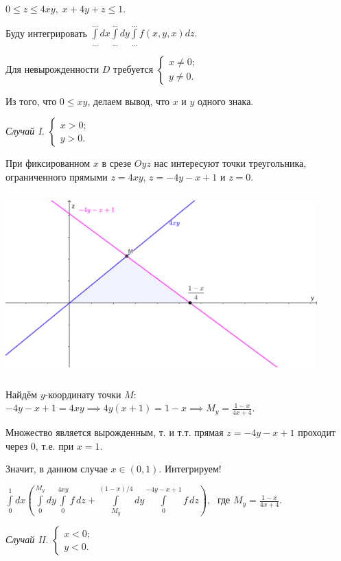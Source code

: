 \documentclass[a4paper, fleqn]{article}
\begin{document}
    $0 \leq z \leq 4xy, \; x + 4y + z \leq 1. $
    
    Буду интегрировать $\displaystyle \int \limits_{\dots}^{\dots} dx \int \limits_{\dots}^{\dots} dy \int \limits_{\dots}^{\dots} f(x, y, x) dz.$
    
    Для невырожденности $D$ требуется $\begin{cases} x \neq 0; \\ y \neq 0. \end{cases}$
    
    Из того, что $0 \leq xy$, делаем вывод, что $x$  и $y$ одного знака.
    
    \textit{Случай I.} $\begin{cases} x > 0; \\ y > 0. \end{cases}$
    
    При фиксированном $x$ в срезе $Oyz$ нас интересуют точки треугольника, ограниченного прямыми $z = 4xy$, $z = -4y - x + 1$ и $z = 0$.
    
   \includegraphics[width=12cm, height=7cm]{list24imgs/task 2.4.5.png}
   
   Найдём $y$-координату точки $M$: $ -4y -x + 1 = 4xy \implies 4y(x + 1) = 1 - x \implies M_y = \frac{1 - x}{4x  + 4}.$
   
   Множество является вырожденным, т. и т.т. прямая $z = -4y - x + 1$ проходит через $0$, т.е. при $x = 1.$
   
   Значит, в данном случае $x \in (0, 1)$. Интегрируем!
   
   $\displaystyle \int \limits_{0}^{1} dx \left( \int \limits_{0}^{M_y} dy \int \limits_{0}^{4xy} f \,  dz + \int \limits_{M_y}^{(1 - x)/4} dy \int \limits_{0}^{-4y - x + 1} f \,  dz \right), \; $ где  $M_y = \frac{1 - x}{4x  + 4}$.
   
   \textit{Случай II.} $\begin{cases}
   x < 0;\\
   y < 0.
   \end{cases}$
   
\end{document}
